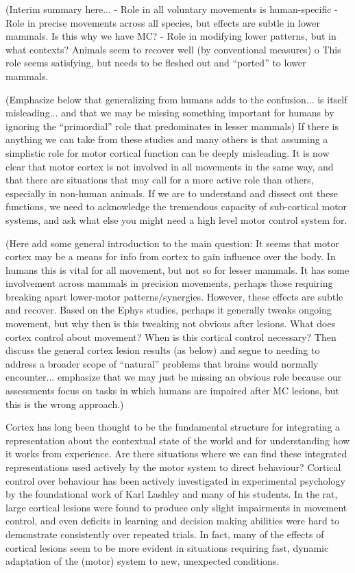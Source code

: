  

(Interim summary here...
- Role in all voluntary movements is human-specific
- Role in precise movements across all species, but effects are subtle in lower mammals. Is this why we have MC?
- Role in modifying lower patterns, but in what contexts? Animals seem to recover well (by conventional measures)
o This role seems satisfying, but needs to be fleshed out and ``ported'' to lower mammals.


(Emphasize below that generalizing from humans adds to the confusion... is itself misleading... and that we may be missing something important for humans by ignoring the ``primordial'' role that predominates in lesser mammals)
If there is anything we can take from these studies and many others is that assuming a simplistic role for motor cortical function can be deeply misleading. It is now clear that motor cortex is not involved in all movements in the same way, and that there are situations that may call for a more active role than others, especially in non-human animals. If we are to understand and dissect out these functions, we need to acknowledge the tremendous capacity of sub-cortical motor systems, and ask what else you might need a high level motor control system for.

(Here add some general introduction to the main question: It seems that motor cortex may be a means for info from cortex to gain influence over the body. In humans this is vital for all movement, but not so for lesser mammals. It has some involvement across mammals in precision movements, perhaps those requiring breaking apart lower-motor patterns/synergies. However, these effects are subtle and recover. Based on the Ephys studies, perhaps it generally tweaks ongoing movement, but why then is this tweaking not obvious after lesions. What does cortex control about movement? When is this cortical control necessary? Then discuss the general cortex lesion results (as below) and segue to needing to address a broader scope of ``natural'' problems that brains would normally encounter... emphasize that we may just be missing an obvious role because our assessments focus on tasks in which humans are impaired after MC lesions, but this is the wrong approach.)


Cortex has long been thought to be the fundamental structure for integrating a representation about the contextual state of the world and for understanding how it works from experience. Are there situations where we can find these integrated representations used actively by the motor system to direct behaviour? Cortical control over behaviour has been actively investigated in experimental psychology by the foundational work of Karl Lashley and many of his students. In the rat, large cortical lesions were found to produce only slight impairments in movement control, and even deficits in learning and decision making abilities were hard to demonstrate consistently over repeated trials. In fact, many of the effects of cortical lesions seem to be more evident in situations requiring fast, dynamic adaptation of the (motor) system to new, unexpected conditions.

